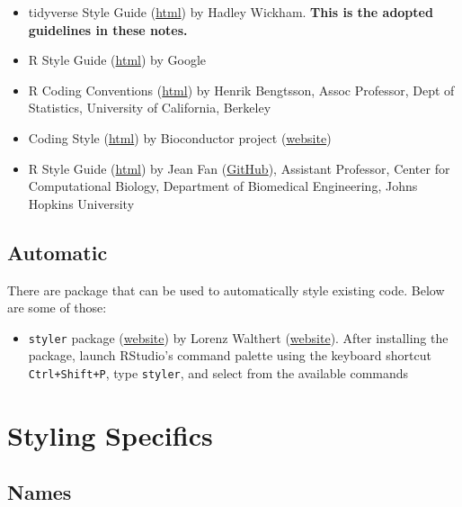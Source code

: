\documentclass[
  letterpaper,
  DIV=11,
  numbers=noendperiod]{scrreprt}
\providecommand{\tightlist}{%
  \setlength{\itemsep}{0pt}\setlength{\parskip}{0pt}}\usepackage{longtable,booktabs,array}
\begin{document}
\begin{itemize}
\tightlist
\item
  tidyverse Style Guide (\href{https://style.tidyverse.org/}{html}) by
  Hadley Wickham. \textbf{This is the adopted guidelines in these
  notes.}
\item
  R Style Guide
  (\href{https://google.github.io/styleguide/Rguide.html}{html}) by
  Google
\item
  R Coding Conventions
  (\href{https://docs.google.com/document/d/1esDVxyWvH8AsX-VJa-8oqWaHLs4stGlIbk8kLc5VlII/preview}{html})
  by Henrik Bengtsson, Assoc Professor, Dept of Statistics, University
  of California, Berkeley
\item
  Coding Style
  (\href{https://contributions.bioconductor.org/r-code.html\#r-code}{html})
  by Bioconductor project (\href{https://bioconductor.org/}{website})
\item
  R Style Guide (\href{https://jef.works/R-style-guide/}{html}) by Jean
  Fan (\href{https://github.com/JEFworks}{GitHub}), Assistant Professor,
  Center for Computational Biology, Department of Biomedical
  Engineering, Johns Hopkins University
\end{itemize}

\subsection{Automatic}\label{automatic}

There are package that can be used to automatically style existing code.
Below are some of those:

\begin{itemize}
\tightlist
\item
  \texttt{styler} package (\href{https://styler.r-lib.org/}{website}) by
  Lorenz Walthert (\href{https://lorenzwalthert.com/}{website}). After
  installing the package, launch RStudio's command palette using the
  keyboard shortcut \texttt{Ctrl+Shift+P}, type \texttt{styler}, and
  select from the available commands
\end{itemize}

\section{Styling Specifics}\label{styling-specifics}

\subsection{Names}\label{names}
\end{document}
